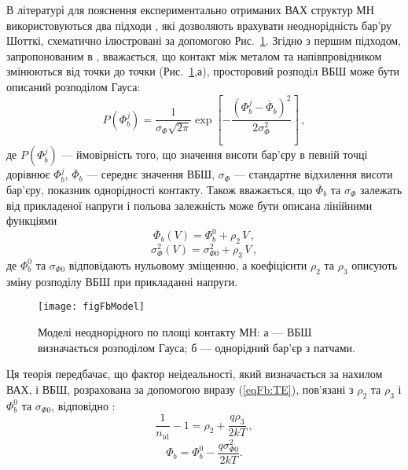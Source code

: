 В літературі для пояснення експериментально отриманих ВАХ структур МН використовуються два
підходи \cite{Sarpatwari, Tascioglu2010, Yildirim2010, Mamor, Iucolano2007JAP, Iucolano2007APL}, які дозволяють
врахувати неоднорідність бар'ру Шотткі,
схематично ілюстровані за допомогою Рис.~\ref{figFbModel}.
Згідно з першим підходом, запропонованим в \cite{Werner}, вважається, що контакт між металом та напівпровідником
змінюються від точки до точки (Рис.~\ref{figFbModel},а),  просторовий розподіл ВБШ  може бути описаний розподілом Гауса:
\begin{equation}\label{eqFbWerner}
  P(\Phi_{b}^j)=\frac{1}{\sigma_\Phi\sqrt{2\pi}}\exp\left[-\frac{(\Phi_{b}^j-\overline{\Phi}_{b})^2}{2\sigma_\Phi^2}\right]\,,
\end{equation}
де
$P(\Phi_{b}^j)$ --- ймовірність того, що значення висоти бар'єру в певній точці дорівнює $\Phi_{b}^j$,
$\overline{\Phi}_{b}$ --- середнє значення ВБШ,
$\sigma_\Phi$ --- стандартне відхилення висоти бар'єру, показник однорідності контакту.
Також вважається, що $\overline{\Phi}_{b}$ та $\sigma_\Phi$ залежать
від прикладеної напруги і польова залежність може бути описана лінійними функціями
\begin{equation}\label{eqFbV}
   \overline{\Phi}_{b}(V)=\Phi_{b}^0+\rho_2\,V\,,
\end{equation}
\begin{equation}\label{eqNV}
   \sigma_\Phi^2(V)=\sigma_{\Phi0}^2+\rho_3\,V\,,
\end{equation}
де
$\Phi_{b}^0$ та $\sigma_{\Phi0}$ відповідають нульовому зміщенню,
а коефіцієнти $\rho_2$ та $\rho_3$ описують зміну розподілу ВБШ при прикладанні напруги.

\begin{figure}
\center
\texttt{[image: figFbModel]}
\caption{\label{figFbModel}
Моделі неоднорідного по площі контакту МН:
а --- ВБШ визначається розподілом Гауса;
б --- однорідний бар'єр з патчами.
}%
\end{figure}

Ця теорія передбачає,
що фактор неідеальності, який визначається за нахилом ВАХ, і ВБШ, розрахована за допомогою виразу (\ref{eqFb:TE}),
пов'язані з $\rho_2$ та $\rho_3$ і
$\Phi_{b}^0$ та $\sigma_{\Phi0}$, відповідно \cite{Werner,Tascioglu2010,Yildirim2010,Mamor,Soylu}:
\begin{equation}\label{eqNidT}
  \frac{1}{n_\mathrm{id}}-1=\rho_2+\frac{q\rho_3}{2kT}\,,
\end{equation}
\begin{equation}\label{eqFb0T}
\Phi_b=\Phi_b^0-\frac{q\sigma^2_{\Phi0}}{2kT}.
\end{equation}

